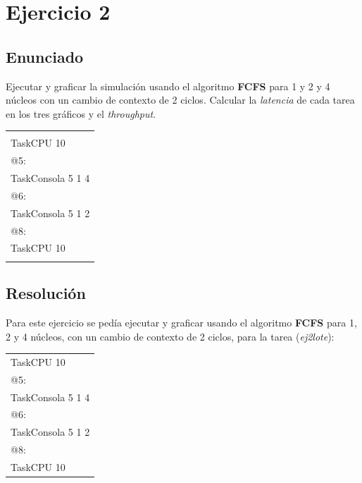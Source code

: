 \section{Ejercicio 2}

\subsection{Enunciado}

Ejecutar y graficar la simulación usando el algoritmo \textbf{FCFS} para 1 y 2 y 4 núcleos con un cambio de contexto de 2 ciclos. Calcular la \textit{latencia} de cada tarea en los tres gráficos y el \textit{throughput}.

\begin{center}
	\begin{tabular}{|l|}
		\hline
							\\
		TaskCPU 10			\\
		@5:					\\
		TaskConsola 5 1 4	\\
		@6:					\\
		TaskConsola 5 1 2	\\
		@8:					\\
		TaskCPU 10			\\
							\\
		\hline
	\end{tabular}
\end{center}


\subsection{Resolución}

Para este ejercicio se pedía ejecutar y graficar usando el algoritmo \textbf{FCFS} para 1, 2 y 4 núcleos, con un cambio de contexto de 2 ciclos, para la tarea (\emph{ej2lote}): 

\begin{center}
	\begin{tabular}{|l|}
		\hline
		TaskCPU 10			\\
		@5:					\\
		TaskConsola 5 1 4	\\
		@6:					\\
		TaskConsola 5 1 2	\\
		@8:					\\
		TaskCPU 10			\\
		\hline
	\end{tabular}
\end{center}

